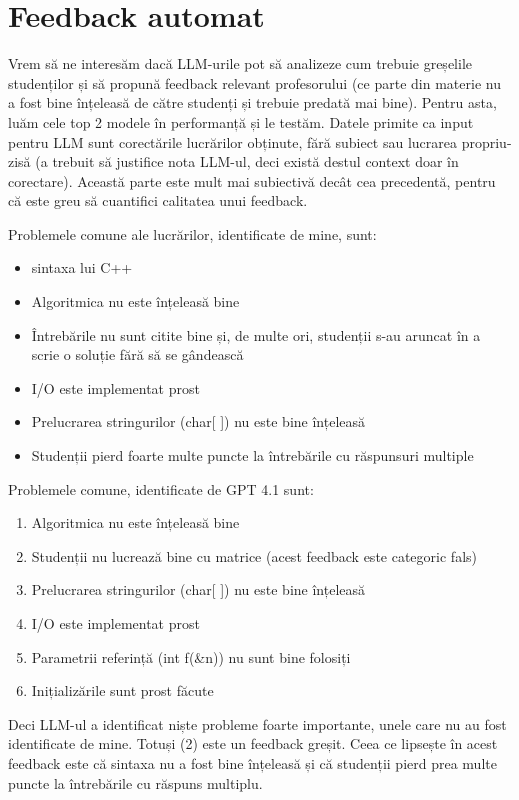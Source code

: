 \documentclass[12pt, a4paper]{report}
\begin{document}
\section{Feedback automat}
Vrem să ne interesăm dacă LLM-urile pot să analizeze cum trebuie greșelile studenților
și să propună feedback relevant profesorului (ce parte din materie nu a fost bine înțeleasă de către studenți și trebuie predată mai bine).
Pentru asta, luăm cele top 2 modele în performanță și le testăm. Datele primite ca input pentru LLM sunt corectările lucrărilor obținute, fără subiect sau lucrarea propriu-zisă (a trebuit să justifice nota LLM-ul, deci există destul context doar în corectare).
Această parte este mult mai subiectivă decât cea precedentă, pentru că este greu să cuantifici calitatea unui feedback.

Problemele comune ale lucrărilor, identificate de mine, sunt:
\begin{itemize}
\item sintaxa lui C++
\item Algoritmica nu este înțeleasă bine
\item Întrebările nu sunt citite bine și, de multe ori, studenții s-au aruncat în a scrie o soluție fără să se gândească
\item I/O este implementat prost
\item Prelucrarea stringurilor (char[ ]) nu este bine înțeleasă
\item Studenții pierd foarte multe puncte la întrebările cu răspunsuri multiple
\end{itemize}

Problemele comune, identificate de GPT 4.1 sunt:
\begin{enumerate}
\item Algoritmica nu este înțeleasă bine
\item Studenții nu lucrează bine cu matrice (acest feedback este categoric fals)
\item Prelucrarea stringurilor (char[ ]) nu este bine înțeleasă
\item I/O este implementat prost
\item Parametrii referință (int f(\&n)) nu sunt bine folosiți
\item Inițializările sunt prost făcute
\end{enumerate}

Deci LLM-ul a identificat niște probleme foarte importante, unele care nu au fost identificate de mine. Totuși (2) este un feedback greșit.
Ceea ce lipsește în acest feedback este că sintaxa nu a fost bine înțeleasă și că studenții pierd prea multe puncte la întrebările cu răspuns multiplu.
\end{document}
